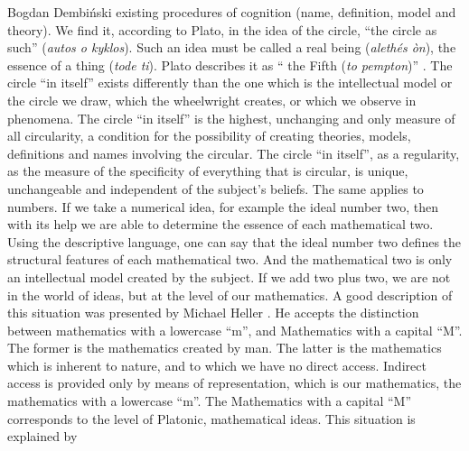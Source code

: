 \begin{artengenv}{Bogdan Dembiński}
existing procedures of cognition (name, definition, model and theory). We find it, according to Plato, in %
 the idea of the circle, ``the circle as such'' (\textit{autos o kyklos}). Such an idea must be called a real being
(\textit{alethés òn}), the essence of a thing (\textit{tode ti}). Plato describes it as ``%
the Fifth (\textit{to pempton})''
\parencite[\textit{Letters}, 342a-343d]{plato_platonis_1955}.
The circle ``in itself''
exists differently than the one which is the intellectual model or the circle we draw, which the wheelwright creates,
or which we observe in phenomena. The circle ``in itself'' is the highest, unchanging and only measure of all
circularity, a condition for the possibility of creating theories, models, definitions and names %
involving the circular. The circle ``in itself'', as a regularity, as the measure of the specificity of everything that is
circular, is unique, unchangeable and independent of the subject’s %
beliefs. %
 The same applies to numbers. If we take a numerical idea, for example the ideal number two, then with its help we are
able to determine the essence of each mathematical two. Using the descriptive language, one can say that the ideal
number two defines the structural features of each mathematical two. And the mathematical two is only an intellectual
model created by the subject. If we add two plus two, we are not in the world of ideas, but at the level of our
mathematics. A good description of this situation was presented by Michael Heller \parencite*{heller_filozofia_2006}.
He accepts the distinction between
mathematics with a lowercase ``m'', and Mathematics with a capital ``M''. The former is the mathematics created by man. The
latter is the mathematics which is inherent to nature, and to which we have no direct access. Indirect access is
provided only by means of representation, which is our mathematics, the mathematics with a lowercase ``m''. The
Mathematics with a capital ``M'' corresponds to the level of Platonic, mathematical ideas. This situation is explained by

\end{artengenv}
